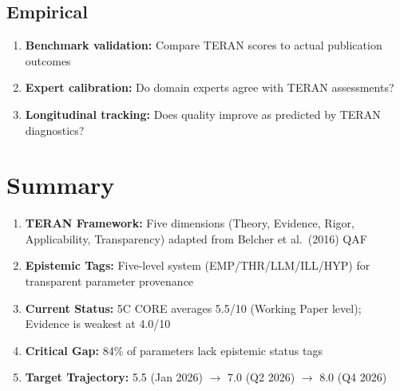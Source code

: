 \documentclass[11pt,a4paper]{article}
\begin{document}
\subsection{Empirical}

\begin{enumerate}
    \item \textbf{Benchmark validation:} Compare TERAN scores to actual publication outcomes
    \item \textbf{Expert calibration:} Do domain experts agree with TERAN assessments?
    \item \textbf{Longitudinal tracking:} Does quality improve as predicted by TERAN diagnostics?
\end{enumerate}


\section{Summary}

\begin{tcolorbox}[colback=gray!10,colframe=gray!50!black,title=\textbf{Key Results}]
\begin{enumerate}
    \item \textbf{TERAN Framework:} Five dimensions (Theory, Evidence, Rigor, Applicability, Transparency) adapted from Belcher et al.\ (2016) QAF
    
    \item \textbf{Epistemic Tags:} Five-level system (EMP/THR/LLM/ILL/HYP) for transparent parameter provenance
    
    \item \textbf{Current Status:} 5C CORE averages 5.5/10 (Working Paper level); Evidence is weakest at 4.0/10
    
    \item \textbf{Critical Gap:} 84\% of parameters lack epistemic status tags
    
    \item \textbf{Target Trajectory:} 5.5 (Jan 2026) $\rightarrow$ 7.0 (Q2 2026) $\rightarrow$ 8.0 (Q4 2026)
\end{enumerate}
\end{tcolorbox}

\end{document}

